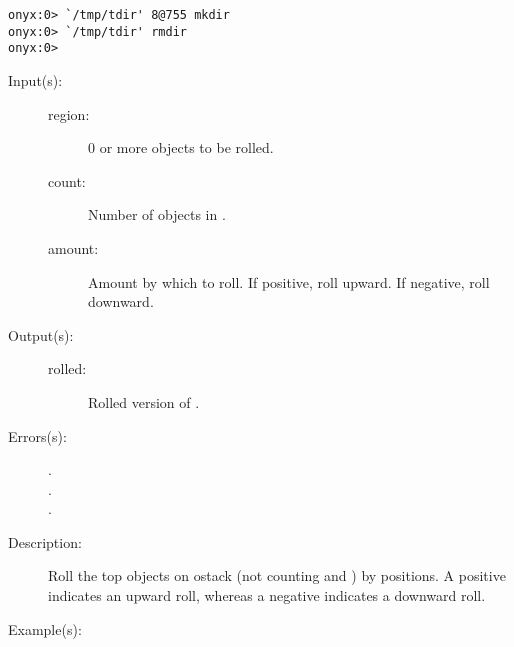 \begin{description}
\begin{description}
\begin{verbatim}
onyx:0> `/tmp/tdir' 8@755 mkdir
onyx:0> `/tmp/tdir' rmdir
onyx:0>
		\end{verbatim}
	\end{description}
\label{systemdict:roll}
\item[{\onyxop{region count amount}{roll}{rolled}}: ]
	\begin{description}\item[]
	\item[Input(s): ]
		\begin{description}\item[]
		\item[region: ]
			0 or more objects to be rolled.
		\item[count: ]
			Number of objects in .
		\item[amount: ]
			Amount by which to roll.  If positive, roll
			upward.  If negative, roll downward.
		\end{description}
	\item[Output(s): ]
		\begin{description}\item[]
		\item[rolled: ]
			Rolled version of .
		\end{description}
	\item[Errors(s): ]
		\begin{description}\item[]
		\item[.]
		\item[.]
		\item[.]
		\end{description}
	\item[Description: ]
		Roll the top  objects on ostack (not counting
		 and ) by  positions.
		A positive  indicates an upward roll, whereas a
		negative  indicates a downward roll.
	\item[Example(s): ]\begin{verbatim}


\end{verbatim}
\end{description}
\end{description}
